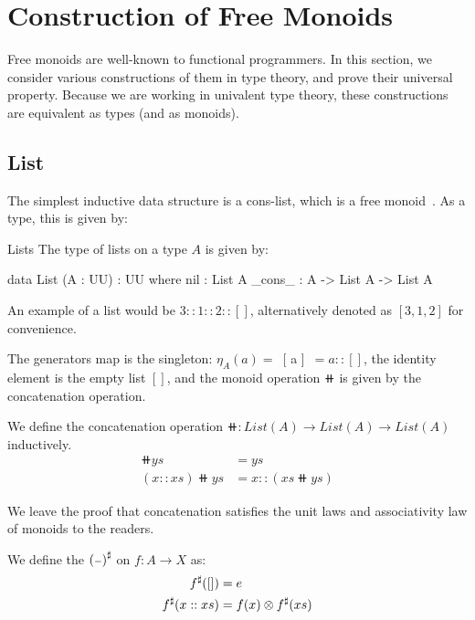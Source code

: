 \section{Construction of Free Monoids}
\label{sec:monoids}

Free monoids are well-known to functional programmers. In this section, we consider various constructions of them in type theory, and prove their universal property. Because we are working in univalent type theory, these constructions are equivalent as types (and as monoids).

\subsection{List}

The simplest inductive data structure is a cons-list, which is a free monoid~\cite{dubucFreeMonoids1974}. As a type, this is given by:

\begin{definition}{Lists}
The type of lists on a type $A$ is given by:
\vspace{1em}
\begin{code}
data List (A : UU) : UU where
  nil : List A
  _cons_ : A -> List A -> List A
\end{code}
\vspace{1em}
\end{definition}

An example of a list would be $3 :: 1 :: 2 :: []$, alternatively denoted as $[3, 1, 2]$ for convenience.

The generators map is the singleton: $\eta_A(a) =$~[ a ]~$= a :: []$, 
the identity element is the empty list $[]$,
and the monoid operation $\doubleplus$ is given by the concatenation operation.

\begin{definition}[Concatenation]
We define the concatenation operation $\doubleplus : List(A) \to List(A) \to List(A)$ inductively.
\begin{align*}
    [] \doubleplus ys & = ys \\
    (x :: xs) \doubleplus ys & = x :: (xs \doubleplus ys)
\end{align*}
\end{definition}

We leave the proof that concatenation satisfies the unit laws and associativity law of monoids to the readers.

\begin{definition}
We define the ${({\scriptstyle{-}})}^{\sharp}$ on $f : A \to X$ as:
\begin{align*}
    {f}^{\sharp}([]) & = e \\
    {f}^{\sharp}(x :: xs) & =  f(x) \otimes {f}^{\sharp}(xs)
\end{align*} 
\end{definition}

